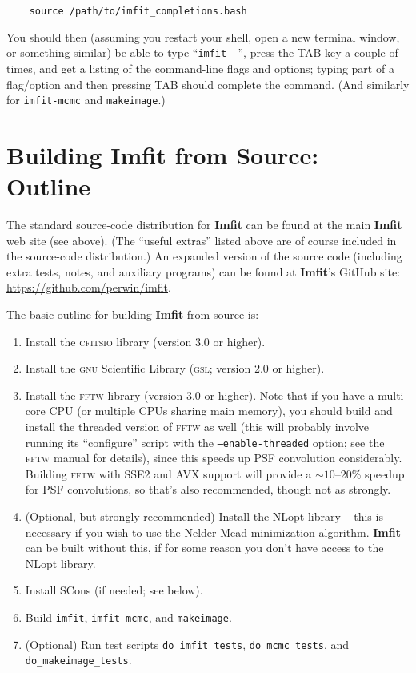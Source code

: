 \documentclass[10pt,a4paper,article]{memoir}
\newcommand{\Imfit}{\textbf{Imfit}}
\newcommand{\imfitprog}{\texttt{imfit}}
\newcommand{\imfitmcmc}{\texttt{imfit-mcmc}}
\newcommand{\makeimage}{\texttt{makeimage}}
\begin{document}
\begin{verbatim}
    source /path/to/imfit_completions.bash
\end{verbatim}

You should then (assuming you restart your shell, open a new terminal
window, or something similar) be able to type ``\texttt{imfit --}'', press the
TAB key a couple of times, and get a listing of the command-line flags
and options; typing part of a flag/option and then pressing TAB should
complete the command. (And similarly for \imfitmcmc{} and \makeimage{}.)



\section{Building \Imfit{} from Source: Outline}

The standard source-code distribution for \Imfit{} can be found at the
main \Imfit{} web site (see above). (The ``useful extras'' listed above
are of course included in the source-code distribution.) An expanded version of
the source code (including extra tests, notes, and auxiliary programs)
can be found at \Imfit's GitHub site:
\url{https://github.com/perwin/imfit}.

The basic outline for building \Imfit{} from source is:

\begin{enumerate}
\item Install the \textsc{cfitsio} library (version 3.0 or higher).

\item Install the \textsc{gnu} Scientific Library (\textsc{gsl}; version 2.0 or higher).

\item Install the \textsc{fftw} library (version 3.0 or higher). Note
that if you have a multi-core CPU (or multiple CPUs sharing main
memory), you should build and install the threaded version of
\textsc{fftw} as well (this will probably involve running its
``configure'' script with the \texttt{--enable-threaded} option; see
the \textsc{fftw} manual for details), since this speeds up PSF convolution
considerably. Building \textsc{fftw} with SSE2 and AVX support will
provide a $\sim 10$--20\% speedup for PSF convolutions, so that's also
recommended, though not as strongly.

\item (Optional, but strongly recommended) Install the NLopt library --
this is necessary if you wish to use the Nelder-Mead minimization
algorithm. \Imfit{} can be built without this, if for some reason
you don't have access to the NLopt library.

\item Install SCons (if needed; see below).

\item Build \imfitprog, \imfitmcmc, and \makeimage.

\item (Optional) Run test scripts \texttt{do\_imfit\_tests}, \texttt{do\_mcmc\_tests},
and \texttt{do\_makeimage\_tests}.

\end{enumerate}
\end{document}
